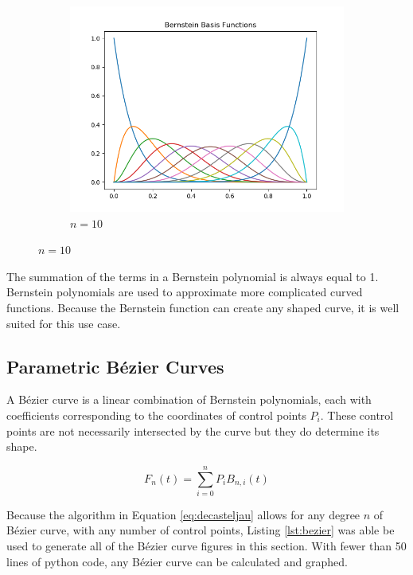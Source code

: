 \documentclass[12pt,letterpaper]{article}
\begin{document}
\begin{figure}[H]
\begin{center}
\begin{subfigure}[b]{.3\linewidth}
            \includegraphics[width=\linewidth]{bern11}
            \caption{$n=10$}
        \end{subfigure}
    \end{center}
\end{figure}

The summation of the terms in a Bernstein polynomial is always equal to 1. Bernstein polynomials are used to approximate more complicated curved functions. Because the Bernstein function can create any shaped curve, it is well suited for this use case. 

\subsection{Parametric B\'ezier Curves}
A B\'ezier curve is a linear combination of Bernstein polynomials, each with coefficients corresponding to the coordinates of control points $P_i$. These control points are not necessarily intersected by the curve but they do determine its shape.

\begin{equation}
	\label{eq:decasteljau}
	F_{n}(t) = \sum_{i=0}^{n} P_{i} B_{n,i}(t)
\end{equation}

Because the algorithm in Equation \ref{eq:decasteljau} allows for any degree $n$ of B\'ezier curve, with any number of control points, Listing \ref{lst:bezier} was able be used to generate all of the B\'ezier curve figures in this section. With fewer than 50 lines of python code, any B\'ezier curve can be calculated and graphed. 
\end{document}
